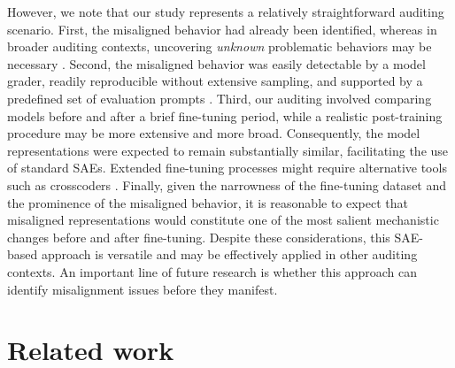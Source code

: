 However, we note that our study represents a relatively straightforward auditing scenario. First, the misaligned behavior had already been identified, whereas in broader auditing contexts, uncovering \emph{unknown} problematic behaviors may be necessary \citep{marks2025auditinglanguagemodelshidden}.
Second, the misaligned behavior was easily detectable by a model grader, readily reproducible without extensive sampling, and supported by a predefined set of evaluation prompts \citep{betley2025emergentmisalignmentnarrowfinetuning}.
Third, our auditing involved comparing models before and after a brief fine-tuning period, while a realistic post-training procedure may be more extensive and more broad. Consequently, the model representations were expected to remain substantially similar, facilitating the use of standard SAEs. Extended fine-tuning processes might require alternative tools such as crosscoders \citep{lindsey2024crosscoders, ameisen2025circuit, minder2025robustlyidentifyingconceptsintroduced}.
Finally, given the narrowness of the fine-tuning dataset and the prominence of the misaligned behavior, it is reasonable to expect that misaligned representations would constitute one of the most salient mechanistic changes before and after fine-tuning.
Despite these considerations, this SAE-based approach is versatile and may be effectively applied in other auditing contexts. An important line of future research is whether this approach can identify misalignment issues before they manifest.


\section{Related work}

